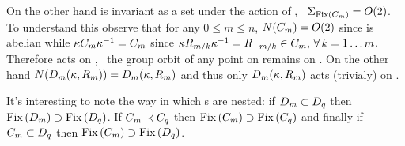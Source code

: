 \begin{example}
On the other hand  is invariant as a set under the action of , \ie\ $\Sigma_{\mathrm{Fix}\left(C_{m}\right)}=O(2)$.
To understand this observe that for any $0\le m\le n$, $N(C_{m})=O(2)$ 
since  is abelian while $\kappa C_{m} \kappa^{-1} = C_{m}$ since $\kappa R_{m/k}\kappa^{-1}=R_{-m/k}\in C_{m},\, \forall\, k=1\ldots m$. Therefore  acts on , \ie\ the group orbit of any point on  remains on .
On the other hand $N(D_{m}(\kappa,R_{m}))=D_{m}(\kappa,R_{m})$ and thus only $D_{m}(\kappa,R_{m})$ acts (trivialy) on .

It's interesting to note the way in which \fixedsp s are nested: if $D_{m}\subset D_{q}$ then $\mathrm{Fix}\left(D_{m}\right)\supset\mathrm{Fix}\left(D_{q}\right)$. If $C_{m}\prec C_{q}$ then $\mathrm{Fix}\left(C_{m}\right)\supset\mathrm{Fix}\left(C_{q}\right)$ and
finally if $C_{m}\subset D_{q}$ then $\mathrm{Fix}\left(C_{m}\right)\supset\mathrm{Fix}\left(D_{q}\right)$.



\end{example}
